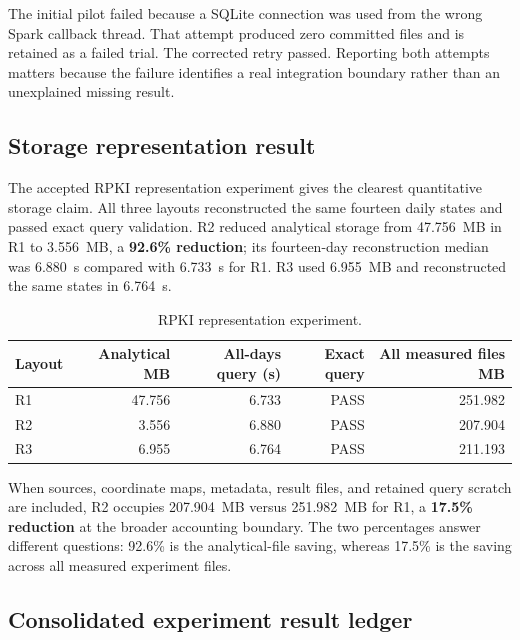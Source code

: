 \documentclass[a4paper,11pt]{article}
\begin{document}
The initial pilot failed because a SQLite connection was used from the wrong Spark callback thread. That attempt produced zero committed files and is retained as a failed trial. The corrected retry passed. Reporting both attempts matters because the failure identifies a real integration boundary rather than an unexplained missing result.

\subsection{Storage representation result}

The accepted RPKI representation experiment gives the clearest quantitative storage claim. All three layouts reconstructed the same fourteen daily states and passed exact query validation. R2 reduced analytical storage from 47.756~MB in R1 to 3.556~MB, a \textbf{92.6\% reduction}; its fourteen-day reconstruction median was 6.880~s compared with 6.733~s for R1. R3 used 6.955~MB and reconstructed the same states in 6.764~s.

\begin{table}[ht]
\centering
\caption{RPKI representation experiment.}
\label{tab:rpki-representation}
\small
\begin{tabular}{@{}lrrrr@{}}
\toprule
Layout & Analytical MB & All-days query (s) & Exact query & All measured files MB \\
\midrule
R1 & 47.756 & 6.733 & PASS & 251.982 \\
R2 & 3.556 & 6.880 & PASS & 207.904 \\
R3 & 6.955 & 6.764 & PASS & 211.193 \\
\bottomrule
\end{tabular}
\end{table}

When sources, coordinate maps, metadata, result files, and retained query scratch are included, R2 occupies 207.904~MB versus 251.982~MB for R1, a \textbf{17.5\% reduction} at the broader accounting boundary. The two percentages answer different questions: 92.6\% is the analytical-file saving, whereas 17.5\% is the saving across all measured experiment files.

\subsection{Consolidated experiment result ledger}
\end{document}
